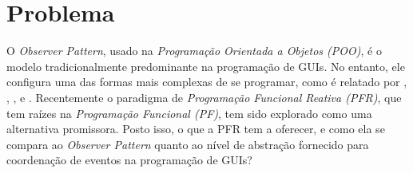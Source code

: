 \section{Problema}\label{lproblema}

O \emph{Observer Pattern}, usado na \emph{Programação Orientada
a Objetos (POO)}, é o modelo tradicionalmente predominante
na programação de GUIs.
No entanto, ele configura uma das formas mais complexas
de se programar, como é relatado por
,
,
,
e .
Recentemente o paradigma de \emph{Programação Funcional Reativa (PFR)},
que tem raízes na \emph{Programação Funcional (PF)},
tem sido explorado como uma alternativa promissora.
Posto isso, o que a PFR tem a oferecer, e como ela se compara ao
\emph{Observer Pattern} quanto ao nível de abstração fornecido para
coordenação de eventos na programação de GUIs?

%
%
%

